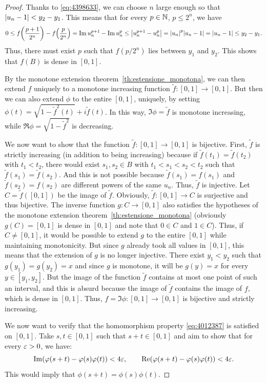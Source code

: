 \begin{proof}
Thanks to \eqref{eq:4398633}, we can choose $n$ large enough so that 
${\left|u_n-1\right|}<y_2-y_1$. 
This means that for every $p\in {\mathbb N}$, $p\le 2^n$, we have 
\[
  0
  \le f{\left( \frac{p+1}{2^n} \right)} - f{\left( \frac{p}{2^n} \right)}
  = \operatorname{Im} u_n^{p+1} - \operatorname{Im} u_n^p 
  \le {\left|u_n^{p+1}-u_n^p\right|}
  = {\left|u_n\right|}^p {\left|u_n-1\right|} 
  = {\left|u_n-1\right|} \le y_2-y_1.
\]
Thus, there must exist $p$ such that $f(p/2^n)$ lies between $y_1$ and $y_2$.
This shows that $f(B)$ is dense in $[0,1]$.

By the monotone extension theorem~\ref{th:estensione_monotona}, we can then
extend
$f$ uniquely to a monotone increasing function $\tilde f \colon [0,1]\to [0,1]$.
But then we can also extend $\phi$ to the entire $[0,1]$,
uniquely,
by setting $\phi(t) = \sqrt{1-{\tilde f}^2(t)} + i \tilde f(t)$. 
In this way, $\Im \phi = \tilde f$ is monotone increasing, while 
$\Re \phi=\sqrt{1-{\tilde f}^2}$ is decreasing.

We now want to show that the function $\tilde f\colon [0,1]\to [0,1]$ 
is bijective.
First, $\tilde f$ is strictly increasing (in addition to being increasing)
because if $\tilde f(t_1)=\tilde f(t_2)$ with $t_1<t_2$, there would exist 
$s_1,s_2\in B$ with $t_1<s_1<s_2<t_2$ such that $\tilde f(s_1)=\tilde f(s_2)$.
And this is not possible because $\tilde f(s_1)=f(s_1)$ and $\tilde f(s_2) =
f(s_2)$ are different powers
of the same $u_n$. Thus, $\tilde f$ is injective.
Let $C=\tilde f([0,1])$ be the image of $\tilde f$. 
Obviously, $\tilde f\colon [0,1]\to C$ is surjective and thus bijective.
The inverse function $g\colon C \to [0,1]$ also satisfies 
the hypotheses of the monotone extension theorem~\ref{th:estensione_monotona}
(obviously $g(C)=[0,1]$ is dense in $[0,1]$ and note that 
$0\in C$ and $1\in C$).
Thus, if $C \neq [0,1]$, it would be possible to extend $g$ to the entire
$[0,1]$ while maintaining monotonicity. 
But since $g$ already took all values in $[0,1]$, this means 
that the extension of $g$ is no longer injective.
There exist $y_1<y_2$ such that $g(y_1)=g(y_2)=x$
and since $g$ is monotone, it will be $g(y)=x$ for every $y\in[y_1,y_2]$. 
But the image of the function $\tilde f$ 
contains at most one point of such an interval, and this is absurd 
because the image of $\tilde f$ contains the image of $f$, which 
is dense in $[0,1]$.
Thus, $f = \Im \phi\colon[0,1]\to[0,1]$ is bijective and strictly 
increasing.

We now want to verify that the homomorphism property 
\eqref{eq:4012387} is satisfied on $[0,1]$.
Take $s,t\in[0,1]$ such that $s+t\in [0,1]$
and aim to show that for every $\varepsilon>0$, 
we have:
\begin{equation}\label{eq:4438844}
  \operatorname{Im}(\varphi(s+t)- \varphi(s)\varphi(t)) < 4\varepsilon,
  \qquad
  \operatorname{Re}(\varphi(s+t)-\varphi(s)\varphi(t)) < 4\varepsilon.
\end{equation}
This would imply that $\phi(s+t)=\phi(s)\phi(t)$.


\end{proof}
